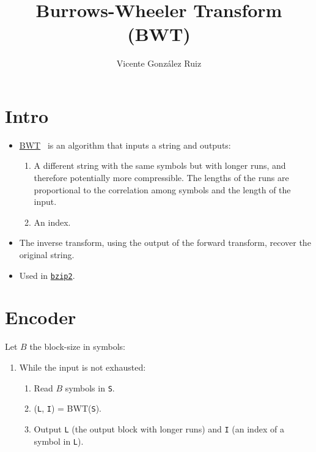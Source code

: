 \title{Burrows-Wheeler Transform (BWT)}
\author{Vicente González Ruiz}
\maketitle

\tableofcontents

\section{Intro}
\begin{itemize}
\item \href{https://scholar.google.es/scholar?hl=es\&as_sdt=0\%2C5\&q=Burrows+M\%2C+Wheeler+DJ\%3A+A+Block+Sorting+Lossless+Data+Compression+Algorithm.\&btnG=}{BWT}~\cite{burrows1994block} is an algorithm that inputs a string and outputs:

  \begin{enumerate}
  \tightlist
  \item
    A different string with the same symbols but with longer runs, and
    therefore potentially more compressible. The lengths of the runs
    are proportional to the correlation among symbols and the length
    of the input.
  \item
    An index.
  \end{enumerate}
\item
  The inverse transform, using the output of the forward transform,
  recover the original string.
\item
  Used in \href{https://en.wikipedia.org/wiki/Bzip2}{\texttt{bzip2}}.
\end{itemize}

\section{Encoder}\label{encoder}

Let \(B\) the block-size in symbols:

\begin{enumerate}
\tightlist
\item
  While the input is not exhausted:
  \begin{enumerate}
  \tightlist
  \item
    Read \(B\) symbols in \texttt{S}.
  \item
    (\texttt{L}, \texttt{I}) = BWT(\texttt{S}).
  \item
    Output \texttt{L} (the output block with longer runs) and \texttt{I}
    (an index of a symbol in \texttt{L}).
  \end{enumerate}
\end{enumerate}


